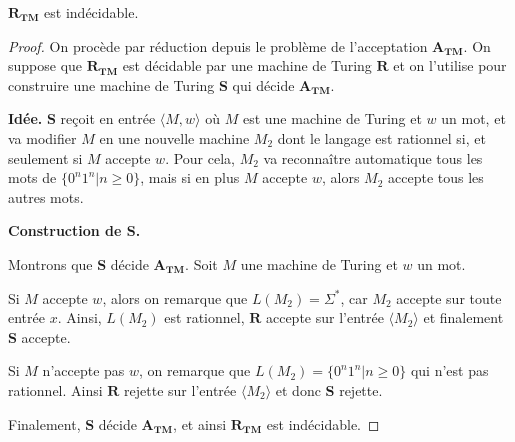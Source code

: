 \begin{theorem}
$\mathbf{R_{TM}}$ est indécidable.
\end{theorem}

\begin{proof}
On procède par réduction depuis le problème de l'acceptation $\mathbf{A_{TM}}$. On suppose que $\mathbf{R_{TM}}$ est décidable par une machine de Turing $\mathbf{R}$ et on l'utilise pour construire une machine de Turing $\mathbf{S}$ qui décide $\mathbf{A_{TM}}$.\newline

\noindent\textbf{Idée.} $\mathbf{S}$ reçoit en entrée $\langle M,w\rangle$ où $M$ est une machine de Turing et $w$ un mot, et va modifier $M$ en une nouvelle machine $M_2$ dont le langage est rationnel si, et seulement si $M$ accepte $w$.
Pour cela, $M_2$ va reconnaître automatique tous les mots de $\{0^n1^n | n\geq 0\}$, mais si en plus $M$ accepte $w$, alors $M_2$ accepte tous les autres mots.\newline

\noindent \textbf{Construction de $\mathbf{S}$.} \newline

\newline

Montrons que $\mathbf{S}$ décide $\mathbf{A_{TM}}$. Soit $M$ une machine de Turing et $w$ un mot.

Si $M$ accepte $w$, alors on remarque que $L(M_2)= \Sigma^*$, car $M_2$ accepte sur toute entrée $x$. Ainsi, $L(M_2)$ est rationnel, $\mathbf{R}$ accepte sur l'entrée $\langle M_2 \rangle$ et finalement $\mathbf{S}$ accepte.

Si $M$ n'accepte pas $w$, on remarque que $L(M_2)= \{0^n1^n | n\geq 0\}$ qui n'est pas rationnel. Ainsi $\mathbf{R}$ rejette sur l'entrée $\langle M_2 \rangle$ et donc $\mathbf{S}$ rejette.

Finalement, $\mathbf{S}$ décide $\mathbf{A_{TM}}$, et ainsi $\mathbf{R_{TM}}$ est indécidable.
\end{proof}


